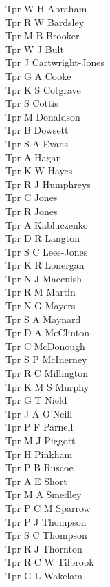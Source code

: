 \begin{multicols}{2}
  Tpr W H Abraham \\
  Tpr R W Bardsley \\
  Tpr M B Brooker \\
  Tpr W J Bult \\
  Tpr J Cartwright-Jones \\
  Tpr G A Cooke \\
  Tpr K S Cotgrave \\
  Tpr S Cottis \\
  Tpr M Donaldson \\
  Tpr B Dowsett \\
  Tpr S A Evans \\
  Tpr A Hagan \\
  Tpr K W Hayes \\
  Tpr R J Humphreys \\
  Tpr C Jones \\
  Tpr R Jones \\
  Tpr A Kabluczenko \\
  Tpr D R Langton \\
  Tpr S C Lees-Jones \\
  Tpr K R Lonergan \\
  Tpr N J Maccuish \\
  Tpr R M Martin \\
  Tpr N G Mayers \\
  Tpr S A Maynard \\
  Tpr D A McClinton \\
  Tpr C McDonough \\
  Tpr S P McInerney \\
  Tpr R C Millington \\
  Tpr K M S Murphy \\
  Tpr G T Nield \\
  Tpr J A O'Neill \\
  Tpr P F Parnell \\
  Tpr M J Piggott \\
  Tpr H Pinkham \\
  Tpr P B Ruscoe \\
  Tpr A E Short \\
  Tpr M A Smedley \\
  Tpr P C M Sparrow \\
  Tpr P J Thompson \\
  Tpr S C Thompson \\
  Tpr R J Thornton \\
  Tpr R C W Tilbrook \\
  Tpr G L Wakelam \\

\end{multicols}
